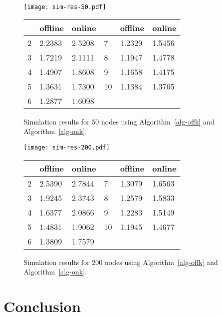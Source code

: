 \documentclass[pdftex,leqno,fleqn,12pts]{llncs}
\begin{document}
\begin{figure}
\centering
\texttt{[image: sim-res-50.pdf]}  
\begin{center}
\begin{tabular}{|l|ll|l|ll|}
\hline
 & offline & online &  & offline & online \\
\hline
2	 & 2.2383	 & 2.5208 & 7	 & 1.2329	 & 1.5456\\
3	 & 1.7219	 & 2.1111 & 8	 & 1.1947	 & 1.4778\\
4	 & 1.4907	 & 1.8608 & 9	 & 1.1658	 & 1.4175\\
5	 & 1.3631	 & 1.7300 & 10	 & 1.1384	 & 1.3765\\
6	 & 1.2877	 & 1.6098 & & & \\
\hline
\end{tabular}
\end{center}
\caption{Simulation results for 50 nodes using Algorithm~\ref{alg-offk} and Algorithm~\ref{alg-onk}.}\label{fig-simres-chromatic-50}
\end{figure}
\begin{figure}
\centering
\texttt{[image: sim-res-200.pdf]} 
\begin{center}
\begin{tabular}{|l|ll|l|ll|}
\hline
 & offline & online &  & offline & online \\
\hline
2 & 2.5390 & 2.7844 & 7 & 1.3079 & 1.6563\\
3 & 1.9245 & 2.3743 & 8 & 1.2579 & 1.5833\\
4 & 1.6377 & 2.0866 & 9 & 1.2283 & 1.5149\\
5 & 1.4831 & 1.9062 & 10 & 1.1945 & 1.4677\\
6 & 1.3809 & 1.7579 & & &\\
\hline
\end{tabular}
\end{center}
\caption{Simulation results for 200 nodes using Algorithm~\ref{alg-offk} and Algorithm~\ref{alg-onk}.}\label{fig-simres-chromatic-200}
\end{figure}













\section{Conclusion}\label{section-conclusion}
\end{document}
